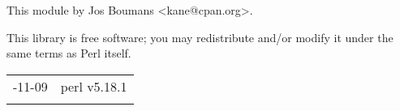 \documentclass[]{article}
\begin{document}

This module by Jos Boumans \textless{}kane@cpan.org\textgreater{}.


This library is free software; you may redistribute and/or modify it
under the same terms as Perl itself.

\begin{longtable}[c]{@{}ll@{}}
\toprule\addlinespace
2013-11-09 & perl v5.18.1
\\\addlinespace
\bottomrule
\end{longtable}
\end{document}
